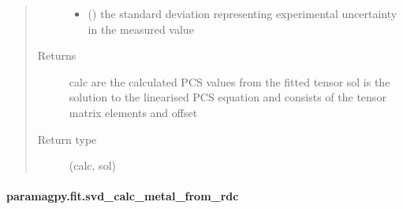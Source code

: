 \documentclass[a4paper,10pt,english,openany,oneside]{sphinxmanual}
\begin{document}
\begin{fulllineitems}
\begin{quote}
\begin{description}
\begin{itemize}
\item {} 
 () \textendash{} the standard deviation representing experimental uncertainty
in the measured value

\end{itemize}

\item[{Returns}] \leavevmode
{} \textendash{} calc are the calculated PCS values from the fitted tensor
sol is the solution to the linearised PCS equation and
consists of the tensor matrix elements and offset

\item[{Return type}] \leavevmode
(calc, sol)

\end{description}\end{quote}

\end{fulllineitems}



\paragraph{paramagpy.fit.svd\_calc\_metal\_from\_rdc}
\label{\detokenize{reference/generated/paramagpy.fit.svd_calc_metal_from_rdc:paramagpy-fit-svd-calc-metal-from-rdc}}\label{\detokenize{reference/generated/paramagpy.fit.svd_calc_metal_from_rdc::doc}}
\end{document}
